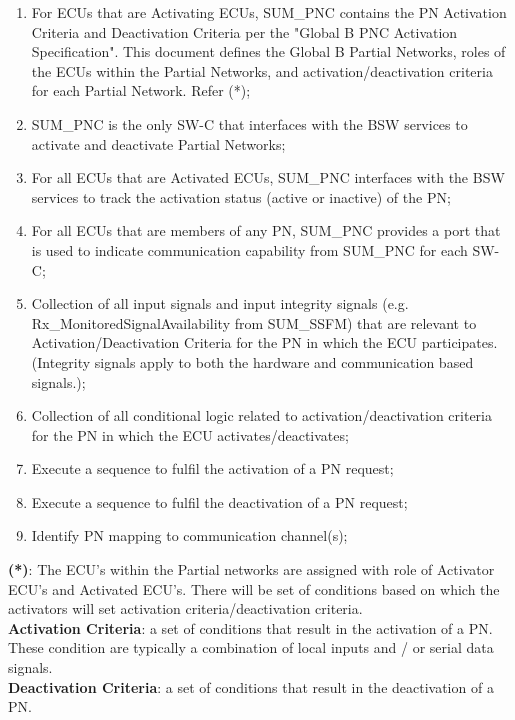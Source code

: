 \begin{enumerate}
	\item For ECUs that are Activating ECUs, SUM\_PNC contains the PN Activation Criteria and Deactivation Criteria per the "Global B PNC Activation Specification". This document defines the Global B Partial Networks, roles of the ECUs within the Partial Networks, and activation/deactivation criteria for each Partial Network. Refer (*);
	\item SUM\_PNC is the only SW-C that interfaces with the BSW services to activate and deactivate Partial Networks;  
	\item For all ECUs that are Activated ECUs, SUM\_PNC interfaces with the BSW services to track the activation status (active or inactive) of the PN; 
	\item For all ECUs that are members of any PN, SUM\_PNC provides a port that is used to indicate communication capability from SUM\_PNC for each SW-C; 
	\item Collection of all input signals and input integrity signals (e.g. Rx\_MonitoredSignalAvailability from SUM\_SSFM) that are relevant to Activation/Deactivation Criteria for the PN in which the ECU participates. (Integrity signals apply to both the hardware and communication based signals.); 
	\item Collection of all conditional logic related to activation/deactivation criteria for the PN in which the ECU activates/deactivates;
	\item Execute a sequence to fulfil the activation of a PN request;
	\item Execute a sequence to fulfil the deactivation of a PN request; 
	\item Identify PN mapping to communication channel(s); 
\end{enumerate}
\noindent
\textbf{(*)}: The ECU’s within the Partial networks are assigned with role of Activator ECU’s and Activated ECU’s. There will be set of conditions based on which the activators will set activation criteria/deactivation criteria.
\\
\textbf{Activation Criteria}: a set of conditions that result in the activation of a PN. These condition are typically a combination of local inputs and / or serial data signals.
\\
\textbf{Deactivation Criteria}: a set of conditions that result in the deactivation of a PN.

